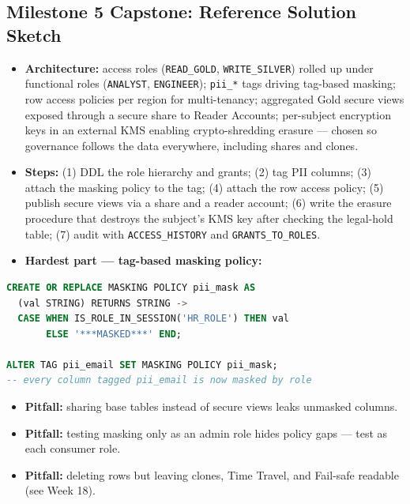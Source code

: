 \documentclass[11pt, a4paper]{article}
\begin{document}
\subsection*{Milestone 5 Capstone: Reference Solution Sketch}
\begin{itemize}[label=-, nosep]
    \item \textbf{Architecture:} access roles (\texttt{READ\_GOLD}, \texttt{WRITE\_SILVER}) rolled up under functional roles (\texttt{ANALYST}, \texttt{ENGINEER}); \texttt{pii\_*} tags driving tag-based masking; row access policies per region for multi-tenancy; aggregated Gold secure views exposed through a secure share to Reader Accounts; per-subject encryption keys in an external KMS enabling crypto-shredding erasure --- chosen so governance follows the data everywhere, including shares and clones.
    \item \textbf{Steps:} (1) DDL the role hierarchy and grants; (2) tag PII columns; (3) attach the masking policy to the tag; (4) attach the row access policy; (5) publish secure views via a share and a reader account; (6) write the erasure procedure that destroys the subject's KMS key after checking the legal-hold table; (7) audit with \texttt{ACCESS\_HISTORY} and \texttt{GRANTS\_TO\_ROLES}.
    \item \textbf{Hardest part --- tag-based masking policy:}
\end{itemize}
\begin{lstlisting}[language=SQL, caption={Tag-based dynamic masking policy}]
CREATE OR REPLACE MASKING POLICY pii_mask AS
  (val STRING) RETURNS STRING ->
  CASE WHEN IS_ROLE_IN_SESSION('HR_ROLE') THEN val
       ELSE '***MASKED***' END;

ALTER TAG pii_email SET MASKING POLICY pii_mask;
-- every column tagged pii_email is now masked by role
\end{lstlisting}
\begin{itemize}[label=-, nosep]
    \item \textbf{Pitfall:} sharing base tables instead of secure views leaks unmasked columns.
    \item \textbf{Pitfall:} testing masking only as an admin role hides policy gaps --- test as each consumer role.
    \item \textbf{Pitfall:} deleting rows but leaving clones, Time Travel, and Fail-safe readable (see Week 18).
\end{itemize}
\end{document}
